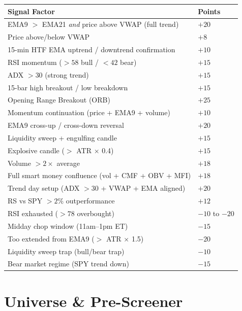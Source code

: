 \documentclass[11pt,a4paper]{article}
\begin{document}
\begin{tabularx}{\linewidth}{X >{\centering\arraybackslash}p{2cm}}
  \toprule
  \rowcolor{accent}\color{white}\textbf{Signal Factor} & \color{white}\textbf{Points} \\
  \midrule
  \rowcolor{lightgray} EMA9 $>$ EMA21 \textit{and} price above VWAP (full trend) & $+20$ \\
  Price above/below VWAP & $+8$ \\
  \rowcolor{lightgray} 15-min HTF EMA uptrend / downtrend confirmation & $+10$ \\
  RSI momentum ($> 58$ bull / $< 42$ bear) & $+15$ \\
  \rowcolor{lightgray} ADX $> 30$ (strong trend) & $+15$ \\
  15-bar high breakout / low breakdown & $+15$ \\
  \rowcolor{lightgray} Opening Range Breakout (ORB) & $+25$ \\
  Momentum continuation (price + EMA9 + volume) & $+10$ \\
  \rowcolor{lightgray} EMA9 cross-up / cross-down reversal & $+20$ \\
  Liquidity sweep + engulfing candle & $+15$ \\
  \rowcolor{lightgray} Explosive candle ($>$ ATR $\times$ 0.4) & $+15$ \\
  Volume $> 2\times$ average & $+18$ \\
  \rowcolor{lightgray} Full smart money confluence (vol + CMF + OBV + MFI) & $+18$ \\
  Trend day setup (ADX $> 30$ + VWAP + EMA aligned) & $+20$ \\
  \rowcolor{lightgray} RS vs SPY $> 2\%$ outperformance & $+12$ \\
  \midrule
  \rowcolor{roworange} RSI exhausted ($> 78$ overbought) & $-10$ to $-20$ \\
  \rowcolor{roworange} Midday chop window (11am--1pm ET) & $-15$ \\
  \rowcolor{roworange} Too extended from EMA9 ($>$ ATR $\times$ 1.5) & $-20$ \\
  \rowcolor{roworange} Liquidity sweep trap (bull/bear trap) & $-10$ \\
  \rowcolor{roworange} Bear market regime (SPY trend down) & $-15$ \\
  \bottomrule
\end{tabularx}

\section{Universe \& Pre-Screener}
\end{document}
